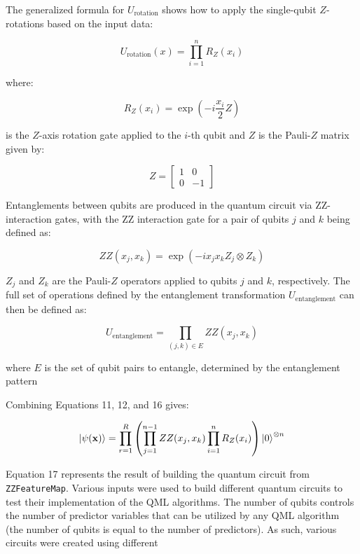 \documentclass[11pt, oneside]{article}   	%
\begin{document}
\noindent The generalized formula for $U_{\text{rotation}}$ shows how to apply the single-qubit $Z$-rotations based on the input data:

\begin{equation}
U_{\text{rotation}}(x) = \prod_{i=1}^{n} R_Z(x_i)
\end{equation}

where:

\begin{equation}
R_Z(x_i) = \exp\left(-i \frac{x_i}{2} Z\right)
\end{equation}

is the $Z$-axis rotation gate applied to the $i$-th qubit and $Z$ is the Pauli-$Z$ matrix given by:

\begin{equation}
Z = 
\begin{bmatrix}
1 & 0 \\
0 & -1
\end{bmatrix}
\end{equation}

Entanglements between qubits are produced in the quantum circuit via ZZ-interaction gates, with the ZZ interaction gate for a pair of qubits $j$ and $k$ being defined as:

\begin{equation}
ZZ(x_j, x_k) = \exp\left(-i x_j x_k Z_j \otimes Z_k\right)
\end{equation}

$Z_j$ and $Z_k$ are the Pauli-$Z$ operators applied to qubits $j$ and $k$, respectively. The full set of operations defined by the entanglement transformation $U_{\text{entanglement}}$ can then be defined as:

\begin{equation}
U_{\text{entanglement}} = \prod_{(j,k) \in E} ZZ(x_j, x_k)
\end{equation}

where $E$ is the set of qubit pairs to entangle, determined by the entanglement pattern


Combining Equations 11, 12, and 16 gives:

\begin{equation}
\ket{\psi(\mathbf{x})} = \prod_{r=1}^R \left( \prod_{j=1}^{n-1} ZZ(x_j, x_k) \prod_{i=1}^n R_Z(x_i) \right) \ket{0}^{\otimes n}
\end{equation}

Equation 17 represents the result of building the quantum circuit from  \texttt{ZZFeatureMap}. Various inputs were used to build different quantum circuits to test their implementation of the QML algorithms. The number of qubits controls the number of predictor variables that can be utilized by any QML algorithm (the number of qubits is equal to the number of predictors). As such, various circuits were created using different 
\end{document}
